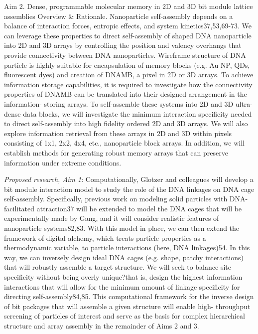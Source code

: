 \documentclass[12pt, oneside]{article}   	%
\begin{document}
Aim 2. Dense, programmable molecular memory in 2D and 3D bit module lattice assemblies
Overview \& Rationale. Nanoparticle self-assembly depends on a balance of interaction forces, entropic effects, and system kinetics37,53,69-73. We can leverage these properties to direct self-assembly of shaped DNA nanoparticle into 2D and 3D arrays by controlling the position and valency overhangs that provide connectivity between DNA nanoparticles. Wireframe structure of DNA particle is highly suitable for encapsulation of memory blocks (e.g. Au NP, QDs, fluorescent dyes) and creation of DNAMB, a pixel in 2D or 3D arrays. To achieve information storage capabilities, it is required to investigate how the connectivity properties of DNAMB can be translated into their designed arrangement in the information- storing arrays. To self-assemble these systems into 2D and 3D ultra-dense data blocks, we will investigate the minimum interaction specificity needed to direct self-assembly into high fidelity ordered 2D and 3D arrays. We will also explore information retrieval from these arrays in 2D and 3D within pixels consisting of 1x1, 2x2, 4x4, etc., nanoparticle block arrays. In addition, we will establish methods for generating robust memory arrays that can preserve information under extreme conditions.

\textit{Proposed research, Aim 1}: Computationally, Glotzer and colleagues will develop a bit module interaction model to study the role of the DNA linkages on DNA cage self-assembly. Specifically, previous work on modeling solid particles with DNA-facilitated attraction37 will be extended to model the DNA cages that will be experimentally made by Gang, and it will consider realistic features of nanoparticle systems82,83. With this model in place, we can then extend the framework of digital alchemy, which treats particle properties as a thermodynamic variable, to particle interactions (here, DNA linkages)54. In this way, we can inversely design ideal DNA cages (e.g. shape, patchy interactions) that will robustly assemble a target structure. We will seek to balance site specificity without being overly unique?that is, design the highest information interactions that will allow for the minimum amount of linkage specificity for directing self-assembly84,85. This computational framework for the inverse design of bit packages that will assemble a given structure will enable high- throughput screening of particles of interest and serve as the basis for complex hierarchical structure and array assembly in the remainder of Aims 2 and 3.
\end{document}
